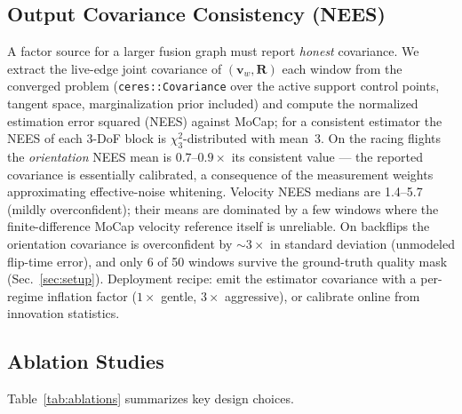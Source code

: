 \documentclass[journal]{IEEEtran}
\newcommand{\vR}{\mathbf{R}}
\newcommand{\vv}{\mathbf{v}}
\begin{document}
\subsection{Output Covariance Consistency (NEES)}
\label{sec:nees}
A factor source for a larger fusion graph must report \emph{honest}
covariance.  We extract the live-edge joint covariance of
$(\vv_w, \vR)$ each window from the converged problem
(\texttt{ceres::Covariance} over the active support control points,
tangent space, marginalization prior included) and compute the
normalized estimation error squared (NEES) against MoCap;
for a consistent estimator the NEES of each 3-DoF block is
$\chi^2_3$-distributed with mean~3.
On the racing flights the \emph{orientation} NEES mean is
$0.7$--$0.9{\times}$ its consistent value --- the reported covariance
is essentially calibrated, a consequence of the measurement weights
approximating effective-noise whitening.  Velocity NEES medians are
1.4--5.7 (mildly overconfident); their means are dominated by a few
windows where the finite-difference MoCap velocity reference itself
is unreliable.  On backflips the orientation covariance is
overconfident by ${\sim}3\times$ in standard deviation (unmodeled
flip-time error), and only 6 of 50 windows survive the ground-truth
quality mask (Sec.~\ref{sec:setup}).  Deployment recipe: emit the
estimator covariance with a per-regime inflation factor
($1\times$ gentle, $3\times$ aggressive), or calibrate online from
innovation statistics.

\subsection{Ablation Studies}
Table~\ref{tab:ablations} summarizes key design choices.
\end{document}
